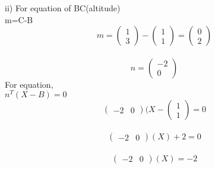 \documentclass{article}
\begin{document}
\begin{itemize}
ii) For equation of BC(altitude)\\

\hspace{4,5 cm}m=C-B\\
\[m=\begin{pmatrix} 1 \\ 3\end{pmatrix}-\begin{pmatrix} 1 \\ 1\end{pmatrix}=\begin{pmatrix} 0 \\ 2\end{pmatrix}\]\\

\[n=\begin{pmatrix} -2 \\ 0\end{pmatrix}\]
For equation,\\

\hspace{4,5 cm}$n^{T}(X-B)=0$\\
\[ \begin{pmatrix} -2 & 0\end{pmatrix}(X-\begin{pmatrix} 1 \\ 1\end{pmatrix}=0\]\\
\[ \begin{pmatrix} -2 & 0\end{pmatrix}(X)+2=0\]\\
\[ \begin{pmatrix} -2 & 0\end{pmatrix}(X)=-2\]
\end{itemize}
\end{document}
